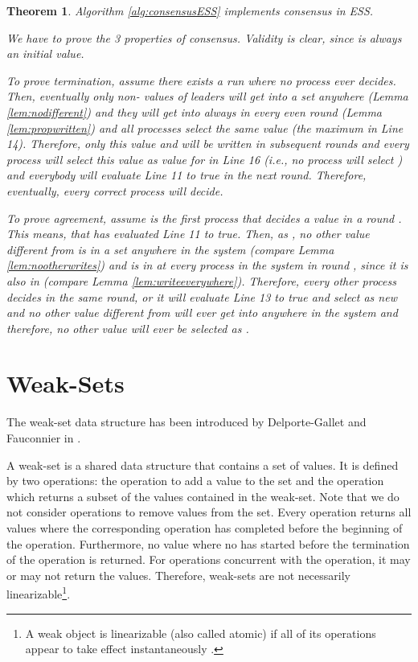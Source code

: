 \documentclass[conference, compsoc]{IEEEtran}
\newtheorem{theorem}{Theorem}
\begin{document}
\begin{theorem}
Algorithm \ref{alg:consensusESS} implements consensus in ESS.
\begin{IEEEproof} 
 We have to prove the 3 properties of consensus. Validity is clear, since  is always an initial value.
 
 To prove termination, assume there exists a run where no process ever decides. Then, eventually only non- values of leaders will get into a set  anywhere (Lemma \ref{lem:nodifferent}) and they will get into  always in every even round (Lemma \ref{lem:propwritten}) and all  processes select the same value (the maximum in Line 14). Therefore, only this value and  will be written in subsequent rounds and every  process will select this value as value for  in Line 16 (i.e., no  process will select ) and everybody will evaluate Line 11 to true in the next round. Therefore, eventually, every correct process will decide.    
 
 To prove agreement, assume  is the first process that decides a value  in a round . This means, that  has evaluated Line 11 to true. Then, as , no other value different from  is in a set  anywhere in the system (compare Lemma \ref{lem:nootherwrites}) and  is in  at every process in the system in round , since it is also in  (compare Lemma \ref{lem:writeeverywhere}). Therefore, every other process decides  in the same round, or it will evaluate Line 13 to true and select  as new  and no other value different from  will ever get into  anywhere in the system and therefore, no other value will ever be selected as .

\end{IEEEproof}
\end{theorem}


\section{Weak-Sets}

The weak-set data structure has been introduced by Delporte-Gallet and Fauconnier in \cite{DF}.

A weak-set  is a shared data structure that contains a set of values. It is defined by two operations: the  operation to add a value  to the set and the  operation which returns a subset of the values contained in the weak-set. Note that we do not consider operations to remove values from the set. Every  operation returns all values  where the corresponding  operation has completed before the beginning of the  operation. Furthermore, no value  where no  has started before the termination of the  operation is returned. For  operations concurrent with the  operation, it may or may not return the values. Therefore, weak-sets are not necessarily linearizable\footnote{A weak object is linearizable (also called atomic) if all of its operations appear to take effect instantaneously \cite{67423}.}.  
\end{document}
